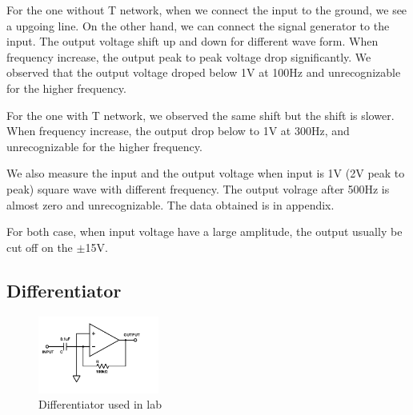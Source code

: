 \documentclass[aps,prl,reprint]{revtex4-1}
\begin{document}
        For the one without T network, when we connect the input to the ground, we see a upgoing line. On the other hand, we can connect the signal generator to the input. The output voltage shift up and down for different wave form. When frequency increase, the output peak to peak voltage drop significantly. We observed that the output voltage droped below 1V at 100Hz and unrecognizable for the higher frequency.

        For the one with T network, we observed the same shift but the shift is slower. When frequency increase, the output drop below to 1V at 300Hz, and unrecognizable for the higher frequency.

        We also measure the input and the output voltage when input is 1V (2V peak to peak) square wave with different frequency. The output volrage after 500Hz is almost zero and unrecognizable. The data obtained is in appendix.

        For both case, when input voltage have a large amplitude, the output usually be cut off on the $\pm$15V.
    \subsection{Differentiator}
        \begin{figure}[h]
            \centering
            \includegraphics[height=1in]{image/differentiator/Differentiator-Lab.pdf}
            \caption{Differentiator used in lab}
            \label{fig:differentiatorLab}
        \end{figure}{}
\end{document}
